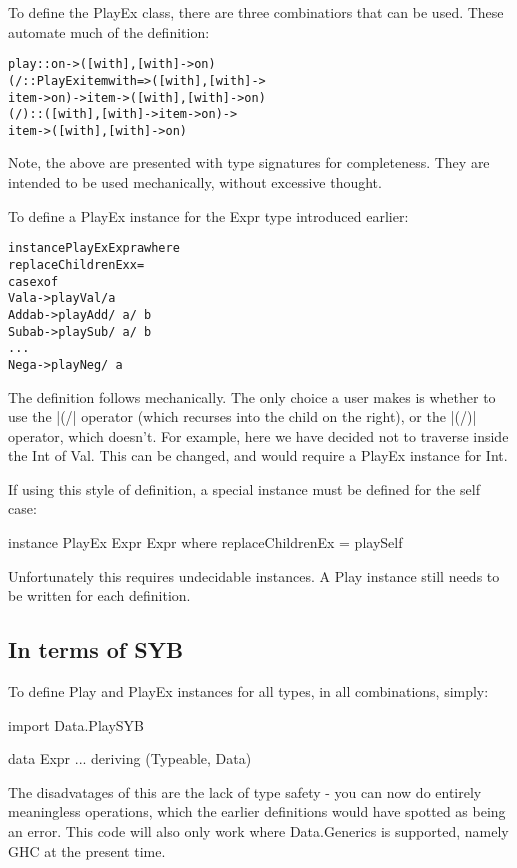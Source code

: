 \documentclass[preprint]{sigplanconf}
\newenvironment{code}{\begin{alltt}\small}{\end{alltt}}
\begin{document}
 To define the PlayEx class, there are three combinatiors that can be used. These automate much of the definition:

\begin{code}
play :: on -> ([with],[with] -> on)
(/\) :: PlayEx item with => ([with], [with] ->
    item -> on) -> item -> ([with], [with] -> on)
(/\!) :: ([with], [with] -> item -> on) ->
    item -> ([with], [with] -> on)
\end{code}

Note, the above are presented with type signatures for completeness. They are intended to be used mechanically, without excessive thought.

To define a PlayEx instance for the Expr type introduced earlier:

\begin{code}
instance PlayEx Expr a where
    replaceChildrenEx x =
        case x of
            Val a -> play Val /\! a
            Add a b -> play Add /\ a /\ b
            Sub a b -> play Sub /\ a /\ b
            ...
            Neg a -> play Neg /\ a
\end{code}

The definition follows mechanically. The only choice a user makes is whether to use the |(/\)| operator (which recurses into the child on the right), or the |(/\!)| operator, which doesn't. For example, here we have decided not to traverse inside the Int of Val. This can be changed, and would require a PlayEx instance for Int.

If using this style of definition, a special instance must be defined for the self case:

instance PlayEx Expr Expr where
    replaceChildrenEx = playSelf

Unfortunately this requires undecidable instances. A Play instance still needs to be written for each definition.


\subsection{In terms of SYB}

 To define Play and PlayEx instances for all types, in all combinations, simply:

import Data.PlaySYB

data Expr ... deriving (Typeable, Data)

The disadvatages of this are the lack of type safety - you can now do entirely meaningless operations, which the earlier definitions would have spotted as being an error. This code will also only work where Data.Generics is supported, namely GHC at the present time.
\end{document}
